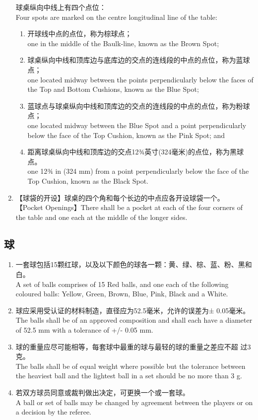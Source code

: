 \begin{enumerate}[label=(\alph*)]
    球桌纵向中线上有四个点位：\\
    Four spots are marked on the centre longitudinal line of the table:
    \begin{enumerate}[label=(\roman*)]
        \item 开球线中点的点位，称为棕球点；\\
        one in the middle of the Baulk-line, known as the Brown Spot;
        \item 球桌纵向中线和顶库边与底库边的交点的连线段的中点的点位，称为蓝球点；\\
        one located midway between the points perpendicularly below the faces of the Top and Bottom Cushions, known as the Blue Spot;
        \item 蓝球点与球桌纵向中线和顶库边的交点的连线段的中点的点位，称为粉球点；\\
        one located midway between the Blue Spot and a point perpendicularly below the face of the Top Cushion, known as the Pink Spot; and        \item 距离球桌纵向中线和顶库边的交点12¾英寸(324毫米)的点位，称为黑球点。\\
        one 12¾ in (324 mm) from a point perpendicularly below the face of the Top Cushion, known as the Black Spot.
    \end{enumerate}
    \item【球袋的开设】球桌的四个角和每个长边的中点应各开设球袋一个。\\
    【Pocket Openings】There shall be a pocket at each of the four corners of the table and one each at the middle of the longer sides.
\end{enumerate}

\subsection{球}

\begin{enumerate}
    \item 一套球包括15颗红球，以及以下颜色的球各一颗：黄、绿、棕、蓝、粉、黑和白。\\
    A set of balls comprises of 15 Red balls, and one each of the following coloured balls: Yellow, Green, Brown, Blue, Pink, Black and a White. 
    \item 球应采用受认证的材料制造，直径应为52.5毫米，允许的误差为± 0.05毫米。\\
    The balls shall be of an approved composition and shall each have a diameter of 52.5 mm with a tolerance of +/- 0.05 mm. 
    \item 球的重量应尽可能相等，每套球中最重的球与最轻的球的重量之差应不超
    过3克。\\
    The balls shall be of equal weight where possible but the tolerance between the heaviest ball and the lightest ball in a set should be no more than 3 g.
    \item 若双方球员同意或裁判做出决定，可更换一个或一套球。\\
    A ball or set of balls may be changed by agreement between the players or on a decision by the referee.
\end{enumerate}

